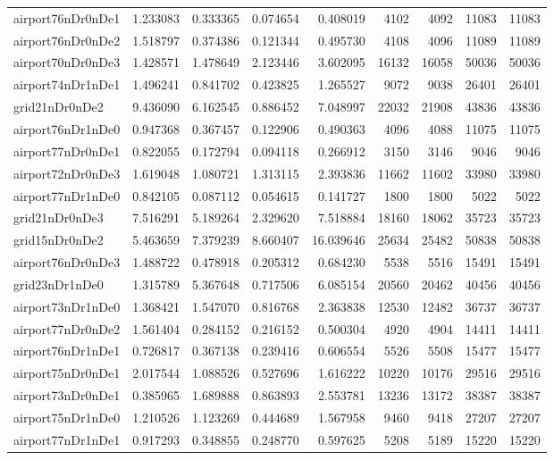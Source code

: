 \begin{longtable}{|l|r|r|r|r|r|r|r|r|}
airport76nDr0nDe1 & 1.233083 & 0.333365 & 0.074654 & 0.408019 & 4102 & 4092 & 11083 & 11083 \\
airport76nDr0nDe2 & 1.518797 & 0.374386 & 0.121344 & 0.495730 & 4108 & 4096 & 11089 & 11089 \\
airport70nDr0nDe3 & 1.428571 & 1.478649 & 2.123446 & 3.602095 & 16132 & 16058 & 50036 & 50036 \\
airport74nDr1nDe1 & 1.496241 & 0.841702 & 0.423825 & 1.265527 & 9072 & 9038 & 26401 & 26401 \\
grid21nDr0nDe2 & 9.436090 & 6.162545 & 0.886452 & 7.048997 & 22032 & 21908 & 43836 & 43836 \\
airport76nDr1nDe0 & 0.947368 & 0.367457 & 0.122906 & 0.490363 & 4096 & 4088 & 11075 & 11075 \\
airport77nDr0nDe1 & 0.822055 & 0.172794 & 0.094118 & 0.266912 & 3150 & 3146 & 9046 & 9046 \\
airport72nDr0nDe3 & 1.619048 & 1.080721 & 1.313115 & 2.393836 & 11662 & 11602 & 33980 & 33980 \\
airport77nDr1nDe0 & 0.842105 & 0.087112 & 0.054615 & 0.141727 & 1800 & 1800 & 5022 & 5022 \\
grid21nDr0nDe3 & 7.516291 & 5.189264 & 2.329620 & 7.518884 & 18160 & 18062 & 35723 & 35723 \\
grid15nDr0nDe2 & 5.463659 & 7.379239 & 8.660407 & 16.039646 & 25634 & 25482 & 50838 & 50838 \\
airport76nDr0nDe3 & 1.488722 & 0.478918 & 0.205312 & 0.684230 & 5538 & 5516 & 15491 & 15491 \\
grid23nDr1nDe0 & 1.315789 & 5.367648 & 0.717506 & 6.085154 & 20560 & 20462 & 40456 & 40456 \\
airport73nDr1nDe0 & 1.368421 & 1.547070 & 0.816768 & 2.363838 & 12530 & 12482 & 36737 & 36737 \\
airport77nDr0nDe2 & 1.561404 & 0.284152 & 0.216152 & 0.500304 & 4920 & 4904 & 14411 & 14411 \\
airport76nDr1nDe1 & 0.726817 & 0.367138 & 0.239416 & 0.606554 & 5526 & 5508 & 15477 & 15477 \\
airport75nDr0nDe1 & 2.017544 & 1.088526 & 0.527696 & 1.616222 & 10220 & 10176 & 29516 & 29516 \\
airport73nDr0nDe1 & 0.385965 & 1.689888 & 0.863893 & 2.553781 & 13236 & 13172 & 38387 & 38387 \\
airport75nDr1nDe0 & 1.210526 & 1.123269 & 0.444689 & 1.567958 & 9460 & 9418 & 27207 & 27207 \\
airport77nDr1nDe1 & 0.917293 & 0.348855 & 0.248770 & 0.597625 & 5208 & 5189 & 15220 & 15220 \\

\end{longtable}
